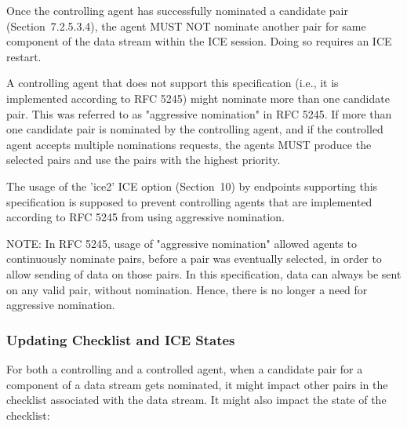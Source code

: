 \documentclass{article}
\begin{document}
Once the controlling agent has successfully nominated a candidate pair (Section~7.2.5.3.4), the agent MUST NOT nominate another pair for same component of the data stream within the ICE session.  Doing so requires an ICE restart.

A controlling agent that does not support this specification (i.e., it is implemented according to RFC 5245) might nominate more than one candidate pair.  This was referred to as "aggressive nomination" in RFC 5245.  If more than one candidate pair is nominated by the controlling agent, and if the controlled agent accepts multiple nominations requests, the agents MUST produce the selected pairs and use the pairs with the highest priority.

The usage of the 'ice2' ICE option (Section~10) by endpoints supporting this specification is supposed to prevent controlling agents that are implemented according to RFC 5245 from using aggressive nomination.

NOTE: In RFC 5245, usage of "aggressive nomination" allowed agents to continuously nominate pairs, before a pair was eventually selected, in order to allow sending of data on those pairs.  In this specification, data can always be sent on any valid pair, without nomination.  Hence, there is no longer a need for aggressive nomination.

\subsubsection{Updating Checklist and ICE States}

For both a controlling and a controlled agent, when a candidate pair for a component of a data stream gets nominated, it might impact other pairs in the checklist associated with the data stream.  It might also impact the state of the checklist:
\end{document}
